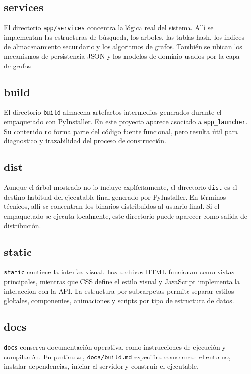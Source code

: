 \documentclass[12pt,onecolumn]{IEEEtran}
\begin{document}
\subsection{services}
El directorio \texttt{app/services} concentra la lógica real del sistema. Allí se implementan las estructuras de búsqueda, los arboles, las tablas hash, los indices de almacenamiento secundario y los algoritmos de grafos. También se ubican los mecanismos de persistencia JSON y los modelos de dominio usados por la capa de grafos.

\subsection{build}
El directorio \texttt{build} almacena artefactos intermedios generados durante el empaquetado con PyInstaller. En este proyecto aparece asociado a \texttt{app\_launcher}. Su contenido no forma parte del código fuente funcional, pero resulta útil para diagnostico y trazabilidad del proceso de construcción.

\subsection{dist}
Aunque el árbol mostrado no lo incluye explícitamente, el directorio \texttt{dist} es el destino habitual del ejecutable final generado por PyInstaller. En términos técnicos, allí se concentran los binarios distribuidos al usuario final. Si el empaquetado se ejecuta localmente, este directorio puede aparecer como salida de distribución.

\subsection{static}
\texttt{static} contiene la interfaz visual. Los archivos HTML funcionan como vistas principales, mientras que CSS define el estilo visual y JavaScript implementa la interacción con la API. La estructura por subcarpetas permite separar estilos globales, componentes, animaciones y scripts por tipo de estructura de datos.

\subsection{docs}
\texttt{docs} conserva documentación operativa, como instrucciones de ejecución y compilación. En particular, \texttt{docs/build.md} especifica como crear el entorno, instalar dependencias, iniciar el servidor y construir el ejecutable.
\end{document}
